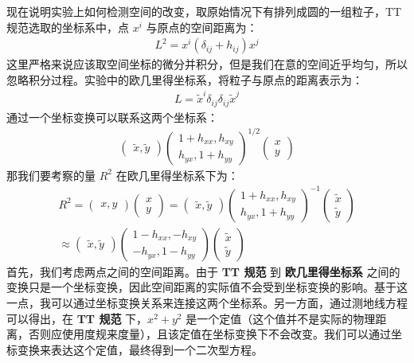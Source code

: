 现在说明实验上如何检测空间的改变，取原始情况下有排列成圆的一组粒子，TT规范选取的坐标系中，点 $x^{i}$ 与原点的空间距离为：
\begin{align}
  L^2 = x^{i}(\delta_{ij}+h_{ij})x^{j}
\end{align}
这里严格来说应该取空间坐标的微分并积分，但是我们在意的空间近乎均匀，所以忽略积分过程。实验中的欧几里得坐标系，将粒子与原点的距离表示为：
\begin{align}
  L = \widetilde{x}^{i}\delta_{ij} \delta_{ij} \widetilde{x}^{j}
\end{align}
通过一个坐标变换可以联系这两个坐标系：
\begin{align}
  \begin{pmatrix}
    \widetilde{x} , \widetilde{y}
  \end{pmatrix}
  \begin{pmatrix}
    1+h_{xx}, h_{xy} \\
    h_{yx}, 1+h_{yy}
  \end{pmatrix}^{1/2}
  \begin{pmatrix}
    x \\
    y
  \end{pmatrix}
\end{align}
那我们要考察的量 $R^2$ 在欧几里得坐标系下为：
\begin{align}
  R^2 = \begin{pmatrix}
    x, y
  \end{pmatrix}
  \begin{pmatrix}
    x\\
    y
  \end{pmatrix}
  = \begin{pmatrix}
    \widetilde{x}, \widetilde{y}
  \end{pmatrix}
  \begin{pmatrix}
    1+h_{xx}, h_{xy} \\
    h_{yx}, 1+h_{yy}
  \end{pmatrix}^{-1}
  \begin{pmatrix}
    \widetilde{x} \\
    \widetilde{y}
  \end{pmatrix} \\
  \approx 
  \begin{pmatrix}
    \widetilde{x}, \widetilde{y}
  \end{pmatrix}
  \begin{pmatrix}
    1-h_{xx}, -h_{xy} \\
    -h_{yx}, 1-h_{yy}
  \end{pmatrix}
  \begin{pmatrix}
    \widetilde{x} \\
    \widetilde{y}
  \end{pmatrix}
\end{align}
首先，我们考虑两点之间的空间距离。由于 \textbf{TT 规范} 到 \textbf{欧几里得坐标系} 之间的变换只是一个坐标变换，因此空间距离的实际值不会受到坐标变换的影响。基于这一点，我可以通过坐标变换关系来连接这两个坐标系。另一方面，通过测地线方程可以得出，在 \textbf{TT 规范} 下，$x^2 + y^2$ 是一个定值（这个值并不是实际的物理距离，否则应使用度规来度量），且该定值在坐标变换下不会改变。我们可以通过坐标变换来表达这个定值，最终得到一个二次型方程。

